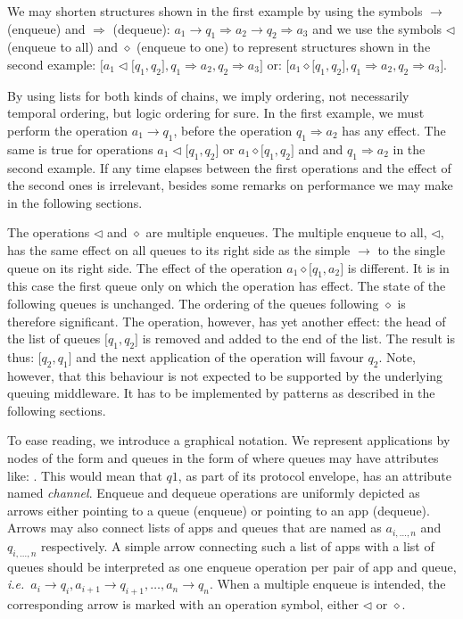 \documentclass[a4paper]{scrartcl}
\newcommand\ie{\textit{i.e.}}
\newcommand{\term}[1]{\emph{#1}}
\newcommand{\enq}{\to}
\newcommand{\deq}{\Rightarrow}
\newcommand{\menqAll}{\triangleleft}
\newcommand{\menqOne}{\diamond}
\begin{document}
We may shorten structures shown in the first example by using
the symbols $\enq$ (enqueue) and $\deq$ (dequeue):
$a_1 \enq q_1 \deq a_2 \enq q_2 \deq a_3$
and we use the symbols $\menqAll$ (enqueue to all) 
and $\menqOne$ (enqueue to one)
to represent structures shown in the second example:
$\lbrack a_1 \menqAll \lbrack q_1,q_2\rbrack, 
         q_1 \deq a_2, q_2 \deq a_3\rbrack$
or:
$\lbrack a_1 \menqOne \lbrack q_1,q_2\rbrack, 
         q_1 \deq a_2, q_2 \deq a_3\rbrack$.

By using lists for both kinds of chains, we imply ordering,
not necessarily temporal ordering, but
logic ordering for sure.
In the first example,
we must perform the operation $a_1 \enq q_1$,
before the operation $q_1 \deq a_2$
has any effect.
The same is true for operations $a_1 \menqAll \lbrack q_1,q_2\rbrack$
or $a_1 \menqOne \lbrack q_1, q_2\rbrack$ and
and $q_1 \deq a_2$ in the second example.
If any time elapses between the first operations
and the effect of the second ones is irrelevant,
besides some remarks on performance we may make 
in the following sections.

The operations $\menqAll$ and $\menqOne$
are multiple enqueues.
The multiple enqueue to all, $\menqAll$,
has the same effect on all queues to its right side
as the simple $\enq$ to the single queue on its right side.
The effect of the operation $a_1 \menqOne \lbrack q_1, a_2\rbrack$ 
is different.
It is in this case the first queue only
on which the operation has effect.
The state of the following queues is unchanged.
The ordering of the queues following $\menqOne$ 
is therefore significant.
The operation, however,
has yet another effect:
the head of the list of queues $\lbrack q_1, q_2\rbrack$
is removed and added to the end of the list.
The result is thus: $\lbrack q_2, q_1\rbrack$
and the next application of the operation will favour $q_2$.
Note, however, that this behaviour is not expected
to be supported by the underlying queuing middleware.
It has to be implemented by patterns as described
in the following sections.

To ease reading,
we introduce a graphical notation.
We represent applications by nodes of the form
and queues in the form of
where queues may have attributes like:
.
This would mean that $q1$,
as part of its protocol envelope,
has an attribute named \term{channel}.
Enqueue and dequeue operations are uniformly
depicted as arrows either pointing to a queue (enqueue)
or pointing to an app (dequeue).
Arrows may also connect lists of apps and queues
that are named as 
$a_{i, \dots, n}$ and
$q_{i, \dots, n}$ respectively.
A simple arrow connecting such a list of apps
with a list of queues should be interpreted as
one enqueue operation per pair of app and queue,
\ie\ $a_i \enq q_i, a_{i+1} \enq q_{i+1}, \dots, a_n \enq q_n$.
When a multiple enqueue is intended,
the corresponding arrow is marked with an operation symbol,
either $\menqAll$ or $\menqOne$.
\end{document}
